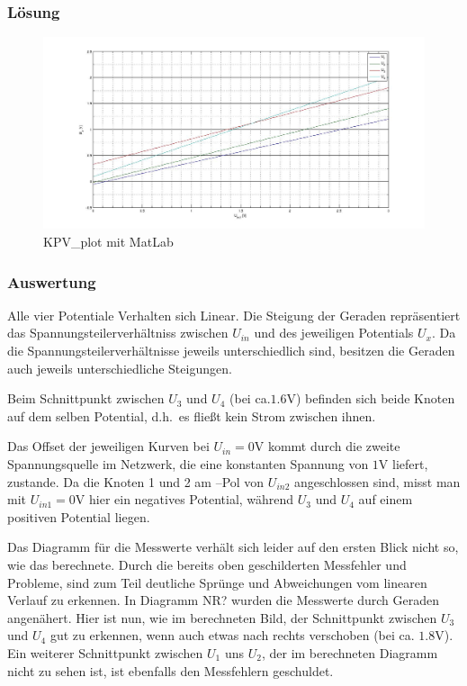 \documentclass[10pt]{report}
\begin{document}
        \subsubsection{Lösung}

        \begin{figure}[H]
            \includegraphics[width=\textwidth]{KPV.jpg}
          \caption{KPV\_plot mit MatLab}
        \end{figure}

        \subsubsection{Auswertung}
        Alle vier Potentiale Verhalten sich Linear. Die Steigung der Geraden
        repräsentiert das Spannungsteilerverhältniss zwischen $U_{in}$ und des
        jeweiligen Potentials $U_x$. Da die Spannungsteilerverhältnisse jeweils
		unterschiedlich sind, besitzen die Geraden auch jeweils unterschiedliche
		Steigungen.

        Beim Schnittpunkt zwischen $U_3$ und $U_4$ (bei ca.$1.6$V) befinden sich
        beide Knoten auf dem selben Potential, d.h.\ es fließt kein Strom zwischen
        ihnen.

        Das Offset der jeweiligen Kurven bei $U_{in} = 0$V kommt durch die zweite
        Spannungsquelle im Netzwerk, die eine konstanten Spannung von $1$V liefert,
        zustande. Da die Knoten 1 und 2 am –Pol von $U_{in2}$ angeschlossen sind, misst 
		man mit $U_{in1} = 0$V hier ein negatives Potential, während $U_3$ und $U_4$ auf
		einem positiven Potential liegen.

        \vspace{0.5cm}
        Das Diagramm für die Messwerte verhält sich leider auf den ersten Blick nicht so,
		wie das berechnete. Durch die bereits oben geschilderten Messfehler und Probleme,
		sind zum Teil deutliche Sprünge und Abweichungen vom linearen Verlauf zu erkennen.
		In Diagramm NR? wurden die Messwerte durch Geraden angenähert. Hier ist nun, wie
		im berechneten Bild, der Schnittpunkt zwischen $U_3$ und $U_4$ gut zu erkennen, wenn auch
		etwas nach rechts verschoben (bei ca. $1.8$V). Ein weiterer  Schnittpunkt zwischen $U_1$
		uns $U_2$, der im berechneten Diagramm nicht zu sehen ist, ist ebenfalls den Messfehlern
		geschuldet.
\end{document}
